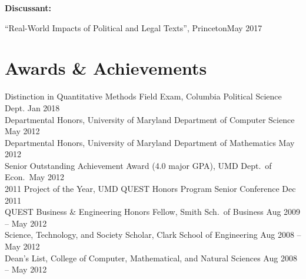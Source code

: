 \documentclass[letterpaper,11pt]{article}
\newcommand{\cvitemsep}{2mm}
\begin{document}
\begin{minipage}{\textwidth}

\textbf{Discussant:}\vspace{\cvitemsep}

``Real-World Impacts of Political and Legal Texts'', Princeton\hfill May 2017 \\


\section{Awards \& Achievements}

Distinction in Quantitative Methods Field Exam, Columbia Political Science Dept. \hfill Jan 2018\vspace{1mm}\\
Departmental Honors, University of Maryland Department of Computer Science \hfill May 2012\vspace{1mm}\\%
Departmental Honors, University of Maryland Department of Mathematics \hfill May 2012\vspace{1mm}\\%
Senior Outstanding Achievement Award (4.0 major GPA), UMD Dept.\ of Econ.\ \hfill May 2012\vspace{1mm}\\%
2011 Project of the Year, UMD QUEST Honors Program Senior Conference \hfill Dec 2011\vspace{1mm}\\%
QUEST Business \& Engineering Honors Fellow, Smith Sch.\ of Business \hfill Aug 2009 -- May 2012\vspace{1mm}\\%
Science, Technology, and Society Scholar, Clark School of Engineering \hfill Aug 2008 -- May 2012\vspace{1mm}\\%
Dean's List, College of Computer, Mathematical, and Natural Sciences \hfill Aug 2008 -- May 2012\\



\end{minipage}
\end{document}
